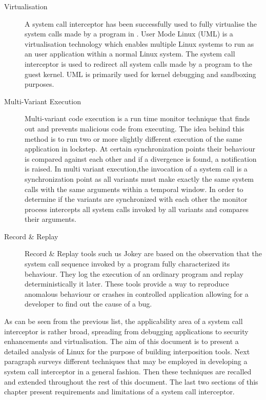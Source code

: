 \begin{description}
\item[Virtualisation] 
A system call interceptor has been successfully used to fully virtualise the system calls made by a program in \cite{UML_1,goanna, UML_2}. User Mode Linux (UML) is a virtualisation technology which enables multiple Linux systems to run as an user application within a normal Linux system. The system call interceptor is used to redirect all system calls made by a program to the guest kernel. UML is primarily used for kernel debugging and sandboxing purposes. 

\item[Multi-Variant Execution]
Multi-variant code execution \cite{orchestra}  is a run time monitor technique that finds out and prevents malicious code from executing. The idea behind this method is to run two or more slightly different execution of the same application in lockstep. At certain synchronization points their behaviour is compared against each other and if a divergence is found, a notification is raised. In multi variant execution,the invocation of a system call is a synchronization point as all variants must make exactly the same system calls with the same arguments within a temporal window.  In order to determine if the variants are synchronized with each other the monitor process intercepts all system calls invoked by all variants and compares their arguments. 

\item[Record \& Replay]
Record \& Replay tools such us Jokey \cite{Saito05jockey:a} are based on the observation that the system call sequence invoked by a program fully characterized its behaviour. They log the execution of an ordinary program and replay deterministically it later. These tools provide a way to reproduce anomalous behaviour or crashes in controlled application  allowing for a developer to find out the cause of a bug. 
  
\end{description}

As can be seen from the previous list, the applicability area of a system call interceptor is rather broad, spreading from debugging applications  to security enhancements and virtualisation. The aim of this document is to present a  detailed analysis of Linux for the purpose of building interposition tools. Next paragraph surveys different techniques that may be employed in developing a system call interceptor in a general fashion. Then these techniques are recalled and extended throughout the rest of this document. The last two sections of this chapter present requirements and limitations of a system call interceptor.  


